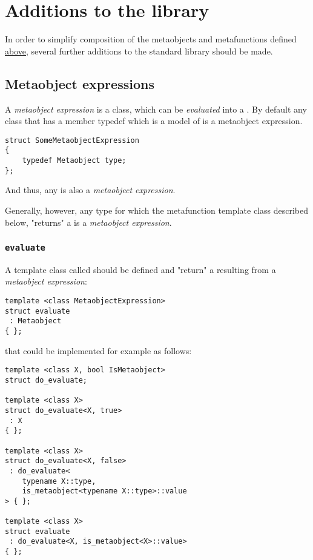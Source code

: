 \section{Additions to the library}
\label{section-Library}

In order to simplify composition of the metaobjects and metafunctions defined
\hyperref[section-Concepts]{above}, several further additions to the standard
library should be made.

\subsection{Metaobject expressions}

A {\em metaobject expression} is a class, which can be {\em evaluated}
into a . By default any class that has a member typedef
which is a model of  is a metaobject expression.

\begin{verbatim}
struct SomeMetaobjectExpression
{
	typedef Metaobject type;
};

\end{verbatim}

And thus, any  is also a {\em metaobject expression}.

Generally, however, any type for which the \verb@evaluate@ metafunction
template class described below, "returns" a  is a {\em metaobject expression}.

\subsubsection{\texttt{evaluate}}

A template class called \verb@evaluate@ should be defined and "return" a 
resulting from a {\em metaobject expression}:

\begin{verbatim}
template <class MetaobjectExpression>
struct evaluate
 : Metaobject
{ };
\end{verbatim}

that could be implemented for example as follows:

\begin{verbatim}
template <class X, bool IsMetaobject>
struct do_evaluate;

template <class X>
struct do_evaluate<X, true>
 : X
{ };

template <class X>
struct do_evaluate<X, false>
 : do_evaluate<
	typename X::type,
	is_metaobject<typename X::type>::value
> { };

template <class X>
struct evaluate
 : do_evaluate<X, is_metaobject<X>::value>
{ };

\end{verbatim}

